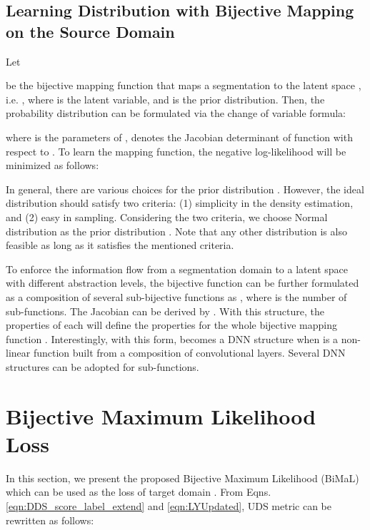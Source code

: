 \documentclass[10pt,twocolumn,letterpaper]{article}
\begin{document}
\subsection{Learning Distribution with Bijective Mapping on the Source Domain} \label{sec:bijective}

Let 
 
be the bijective mapping function that maps a segmentation  to the latent space , i.e. , where  is the latent variable, and  is the prior distribution.
Then, the probability distribution  can be formulated via the change of variable formula:

where  is the parameters of ,  denotes the Jacobian determinant of function  with respect to . 
To learn the mapping function, the negative log-likelihood
will be minimized as follows:

In general, there are various choices for the prior distribution . However, the ideal distribution should satisfy two 
criteria: (1) simplicity in the density estimation, and (2) easy in sampling. 
Considering the two criteria, we choose Normal distribution as the prior distribution . 
Note that any other distribution is also feasible as long as it satisfies the mentioned criteria.



To enforce the information flow from a segmentation domain to a latent space with different abstraction levels, the bijective function  can be further formulated as a composition of several sub-bijective functions  as , 
where  is the number of sub-functions. The Jacobian  can be derived by . With this structure, the properties of each  will define the properties for the whole bijective mapping function . 
Interestingly, with this form,  becomes a DNN structure when  is a non-linear function built from a composition of convolutional layers. Several DNN structures \cite{dinh2015nice, dinh2017density,Duong_2017_ICCV, duong2020vec2face, glow, duong2019learning, truong2021fastflow} can be adopted for sub-functions.








\section{Bijective Maximum Likelihood Loss} 

In this section, we present the proposed Bijective Maximum Likelihood (BiMaL) which can be used as the loss of target domain . 
From Eqns. \eqref{eqn:DDS_score_label_extend} and \eqref{eqn:LYUpdated}, UDS metric can be rewritten as follows: 
\end{document}
